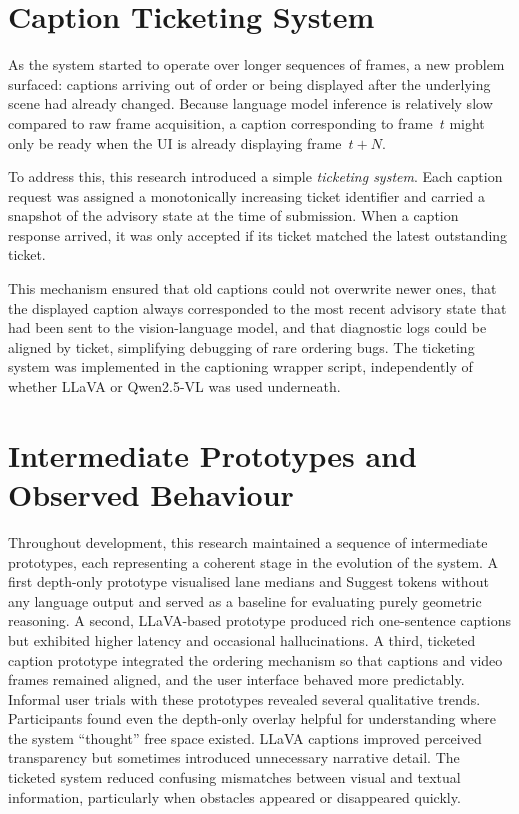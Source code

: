 \documentclass[11pt,a4paper]{article}
\begin{document}
\section{Caption Ticketing System}

As the system started to operate over longer sequences of frames, a new problem surfaced: captions arriving out of order or being displayed after the underlying scene had already changed. Because language model inference is relatively slow compared to raw frame acquisition, a caption corresponding to frame~$t$ might only be ready when the UI is already displaying frame~$t+N$.

To address this, this research introduced a simple \emph{ticketing system}. Each caption request was assigned a monotonically increasing ticket identifier and carried a snapshot of the advisory state at the time of submission. When a caption response arrived, it was only accepted if its ticket matched the latest outstanding ticket.

This mechanism ensured that old captions could not overwrite newer ones, that the displayed caption always corresponded to the most recent advisory state that had been sent to the vision-language model, and that diagnostic logs could be aligned by ticket, simplifying debugging of rare ordering bugs. The ticketing system was implemented in the captioning wrapper script, independently of whether LLaVA or Qwen2.5-VL was used underneath.

\section{Intermediate Prototypes and Observed Behaviour}

Throughout development, this research maintained a sequence of intermediate prototypes, each representing a coherent stage in the evolution of the system. A first depth-only prototype visualised lane medians and Suggest tokens without any language output and served as a baseline for evaluating purely geometric reasoning. A second, LLaVA-based prototype produced rich one-sentence captions but exhibited higher latency and occasional hallucinations. A third, ticketed caption prototype integrated the ordering mechanism so that captions and video frames remained aligned, and the user interface behaved more predictably. Informal user trials with these prototypes revealed several qualitative trends. Participants found even the depth-only overlay helpful for understanding where the system ``thought'' free space existed. LLaVA captions improved perceived transparency but sometimes introduced unnecessary narrative detail. The ticketed system reduced confusing mismatches between visual and textual information, particularly when obstacles appeared or disappeared quickly.
\end{document}
